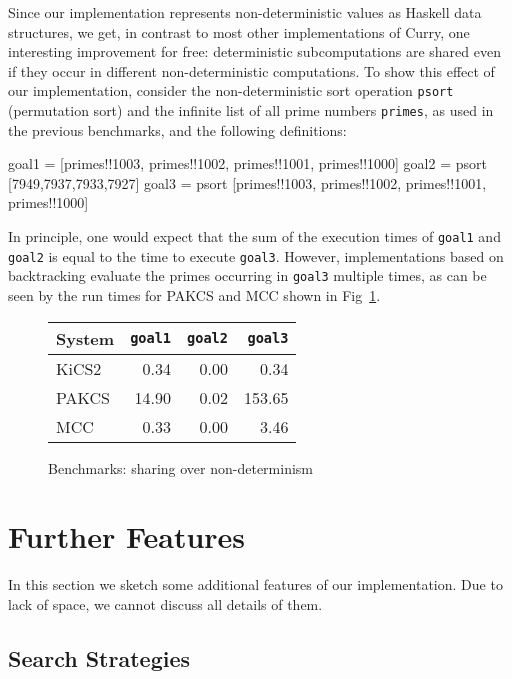 \documentclass{llncs}
\newcommand{\code}[1]{\mbox{\small\texttt{#1}}}
\begin{document}
Since our implementation represents non-deterministic values
as Haskell data structures, we get, in contrast to most
other implementations of Curry, one interesting improvement for free:
deterministic subcomputations are shared even if they occur
in different non-deterministic computations.
To show this effect of our implementation, consider the
non-deterministic sort operation \code{psort} (permutation sort)
and the infinite list of all prime numbers \code{primes},
as used in the previous benchmarks, and the following definitions:
\begin{curry}
 goal1 = [primes!!1003, primes!!1002, primes!!1001, primes!!1000]
 goal2 = psort [7949,7937,7933,7927]
 goal3 = psort [primes!!1003, primes!!1002, primes!!1001, primes!!1000]
\end{curry}
In principle, one would expect that the sum of the execution times
of \code{goal1} and \code{goal2} is equal to the time to execute
\code{goal3}. However, implementations based on backtracking
evaluate the primes occurring in \code{goal3} multiple times,
as can be seen by the run times for PAKCS and MCC shown
in Fig~\ref{fig:bench-sharing-over-nondet}.
%
\begin{figure}
\centering
\begin{tabular}{|@{~~}l@{~~}|*{3}{@{~~}r@{~~}|}}
\hline
System  & \code{goal1} & \code{goal2} & \code{goal3} \\\hline
KiCS2   &        0.34  &        0.00  &        0.34  \\
PAKCS   &       14.90  &        0.02  &      153.65  \\
MCC     &        0.33  &        0.00  &        3.46  \\
\hline
\end{tabular}
\caption{Benchmarks: sharing over non-determinism}
 \label{fig:bench-sharing-over-nondet}
\end{figure}


\section{Further Features}
\label{sec:FurtherAspects}

In this section we sketch some additional features of our implementation.
Due to lack of space, we cannot discuss all details of them.

\subsection{Search Strategies}
\end{document}
